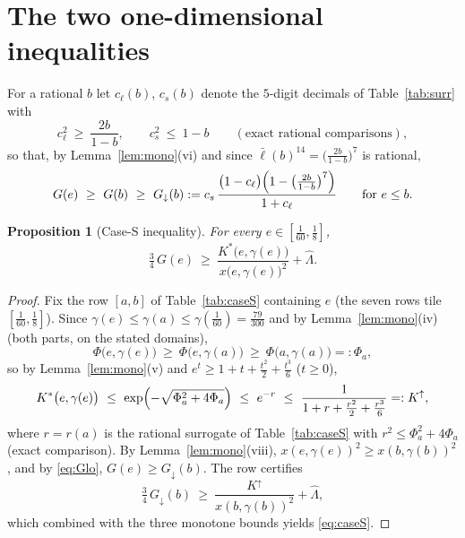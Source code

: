 \documentclass[11pt]{article}
\newtheorem{proposition}[lemma]{Proposition}
\theoremstyle{remark}
\newcommand{\Kstar}{K^{*}}
\newcommand{\lbar}{\bar\ell}
\begin{document}
\section{The two one-dimensional inequalities}

For a rational $b$ let $c_\ell(b)$, $c_s(b)$ denote the $5$-digit decimals
of Table~\ref{tab:surr} with
\begin{equation}\label{eq:surr}
        c_\ell^2\ \ge\ \frac{2b}{1-b},
        \qquad
        c_s^2\ \le\ 1-b
        \qquad(\text{exact rational comparisons}),
\end{equation}
so that, by Lemma~\ref{lem:mono}(vi) and since
$\lbar(b)^{14}=\bigl(\tfrac{2b}{1-b}\bigr)^7$ is rational,
\begin{equation}\label{eq:Glo}
        G(e)\ \ge\ G(b)\ \ge\
        G_\downarrow(b):=c_s\,
        \frac{\bigl(1-c_\ell\bigr)\Bigl(1-\bigl(\tfrac{2b}{1-b}\bigr)^{7}\Bigr)}
        {1+c_\ell}
        \qquad\text{for } e\le b .
\end{equation}

\begin{proposition}[Case-S inequality]\label{prop:caseS}
For every $e\in[\tfrac1{60},\tfrac18]$,
\begin{equation}\label{eq:caseS}
        \tfrac34\,G(e)\ \ge\
        \frac{\Kstar\bigl(e,\gamma(e)\bigr)}{x\bigl(e,\gamma(e)\bigr)^2}
        +\widehat\Lambda .
\end{equation}
\end{proposition}

\begin{proof}
Fix the row $[a,b]$ of Table~\ref{tab:caseS} containing $e$ (the seven rows
tile $[\tfrac1{60},\tfrac18]$).  Since $\gamma(e)\le\gamma(a)\le
\gamma(\tfrac1{60})=\tfrac{79}{300}$ and by
Lemma~\ref{lem:mono}(iv) (both parts, on the stated domains),
\[
        \Phi\bigl(e,\gamma(e)\bigr)\ \ge\ \Phi\bigl(e,\gamma(a)\bigr)
        \ \ge\ \Phi\bigl(a,\gamma(a)\bigr)=:\Phi_a ,
\]
so by Lemma~\ref{lem:mono}(v) and $e^t\ge1+t+\tfrac{t^2}2+\tfrac{t^3}6$
($t\ge0$),
\[
        \Kstar\bigl(e,\gamma(e)\bigr)
        \ \le\ \exp\Bigl(-\sqrt{\Phi_a^2+4\Phi_a}\Bigr)
        \ \le\ e^{-r}
        \ \le\ \frac1{1+r+\frac{r^2}2+\frac{r^3}6}=:K^{\uparrow},
\]
where $r=r(a)$ is the rational surrogate of Table~\ref{tab:caseS} with
$r^2\le\Phi_a^2+4\Phi_a$ (exact comparison).  By
Lemma~\ref{lem:mono}(viii), $x(e,\gamma(e))^2\ge x(b,\gamma(b))^2$, and by
\eqref{eq:Glo}, $G(e)\ge G_\downarrow(b)$.  The row certifies
\[
        \tfrac34\,G_\downarrow(b)\ \ge\
        \frac{K^{\uparrow}}{x(b,\gamma(b))^2}+\widehat\Lambda,
\]
which combined with the three monotone bounds yields \eqref{eq:caseS}.
\end{proof}
\end{document}
